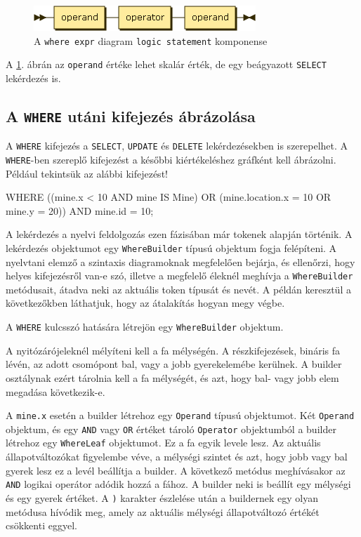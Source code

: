 \begin{figure}[htb]
	\begin{center}
		\includegraphics[scale=0.6]{images/logic_statement}
		\caption{A \texttt{where expr} diagram \texttt{logic statement} komponense}
		\label{fig:logicstatementSytnax}
	\end{center}
\end{figure}

A \ref{fig:logicstatementSytnax}. ábrán az \texttt{operand} értéke lehet skalár érték, de egy beágyazott \texttt{SELECT} lekérdezés is.

\subsection{A \texttt{WHERE} utáni kifejezés ábrázolása}

A \texttt{WHERE} kifejezés a \texttt{SELECT}, \texttt{UPDATE} és \texttt{DELETE} lekérdezésekben is szerepelhet. A \texttt{WHERE}-ben szereplő kifejezést a későbbi kiértékeléshez gráfként kell ábrázolni. Például tekintsük az alábbi kifejezést!
\begin{sql}
WHERE ((mine.x < 10 AND mine IS Mine)
  OR (mine.location.x = 10 OR mine.y = 20)) AND mine.id = 10;
\end{sql}

A lekérdezés a nyelvi feldolgozás ezen fázisában már tokenek alapján történik. A lekérdezés objektumot egy \texttt{WhereBuilder} típusú objektum fogja felépíteni. A nyelvtani elemző a szintaxis diagramoknak megfelelően bejárja, és ellenőrzi, hogy helyes kifejezésről van-e szó, illetve a megfelelő éleknél meghívja a \texttt{WhereBuilder} metódusait, átadva neki az aktuális token típusát és nevét. A példán keresztül a következőkben láthatjuk, hogy az átalakítás hogyan megy végbe.

A \texttt{WHERE} kulcsszó hatására létrejön egy \texttt{WhereBuilder} objektum.

A nyitózárójeleknél mélyíteni kell a fa mélységén. A részkifejezések, bináris fa lévén, az adott csomópont bal, vagy a jobb gyerekelemébe kerülnek. A builder osztálynak ezért tárolnia kell a fa mélységét, és azt, hogy bal- vagy jobb elem megadása következik-e.

A \texttt{mine.x} esetén a builder létrehoz egy \texttt{Operand} típusú objektumot. Két \texttt{Operand} objektum, és egy \texttt{AND} vagy \texttt{OR} értéket tároló \texttt{Operator}  objektumból a builder létrehoz egy \texttt{WhereLeaf} objektumot. Ez a fa egyik levele lesz. Az aktuális állapotváltozókat figyelembe véve, a mélységi szintet és azt, hogy jobb vagy bal gyerek lesz ez a levél beállítja a builder. A következő metódus meghívásakor az \texttt{AND} logikai operátor adódik hozzá a fához. A builder neki is beállít egy mélységi és egy gyerek értéket. A \texttt{)} karakter észlelése után a buildernek egy olyan metódusa hívódik meg, amely az aktuális mélységi állapotváltozó értékét csökkenti eggyel.

